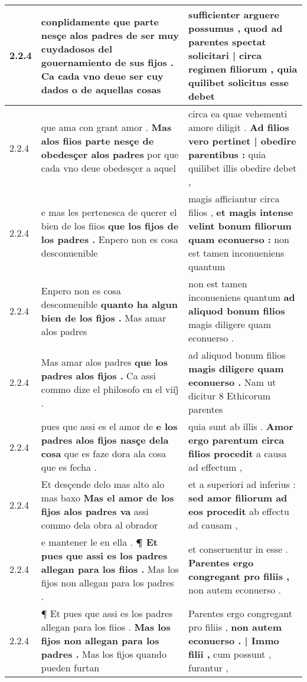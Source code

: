\begin{tabular}{|p{1cm}|p{6.5cm}|p{6.5cm}|}
2.2.4 & conplidamente \textbf{ que parte nesçe alos padres de ser muy cuydadosos del gouernamiento de sus fijos . } Ca cada vno deue ser cuy dados o de aquellas cosas & sufficienter arguere possumus , \textbf{ quod ad parentes spectat solicitari | circa regimen filiorum , } quia quilibet solicitus esse debet \\\hline
2.2.4 & que ama con grant amor . \textbf{ Mas alos fiios parte nesçe de obedesçer alos padres } por que cada vno deue obedesçer a aquel & circa ea quae vehementi amore diligit . \textbf{ Ad filios vero pertinet | obedire parentibus : } quia quilibet illis obedire debet , \\\hline
2.2.4 & e mas les pertenesca de querer el bien de los fiios \textbf{ que los fijos de los padres . } Enpero non es cosa desconuenible & magis afficiantur circa filios , \textbf{ et magis intense velint bonum filiorum quam econuerso : } non est tamen inconueniens quantum \\\hline
2.2.4 & Enpero non es cosa desconuenible \textbf{ quanto ha algun bien de los fijos . } Mas amar alos padres & non est tamen inconueniens quantum \textbf{ ad aliquod bonum filios } magis diligere quam econuerso . \\\hline
2.2.4 & Mas amar alos padres \textbf{ que los padres alos fijos . } Ca assi commo dize el philosofo en el viij̊ . & ad aliquod bonum filios \textbf{ magis diligere quam econuerso . } Nam ut dicitur 8 Ethicorum parentes \\\hline
2.2.4 & pues que assi es el amor de \textbf{ e los padres alos fijos nasçe dela cosa } que es faze dora ala cosa que es fecha . & quia sunt ab illis . \textbf{ Amor ergo parentum circa filios procedit } a causa ad effectum , \\\hline
2.2.4 & Et desçende delo mas alto alo mas baxo \textbf{ Mas el amor de los fijos alos padres va } assi commo dela obra al obrador & et a superiori ad inferius : \textbf{ sed amor filiorum ad eos procedit } ab effectu ad causam , \\\hline
2.2.4 & e mantener le en ella . \textbf{ ¶ Et pues que assi es los padres allegan para los fiios . } Mas los fijos non allegan para los padres . & et conseruentur in esse . \textbf{ Parentes ergo congregant pro filiis , } non autem econuerso . \\\hline
2.2.4 & ¶ Et pues que assi es los padres allegan para los fiios . \textbf{ Mas los fijos non allegan para los padres . } Mas los fijos quando pueden furtan & Parentes ergo congregant pro filiis , \textbf{ non autem econuerso . | Immo filii , } cum possunt , furantur , \\\hline

\end{tabular}
